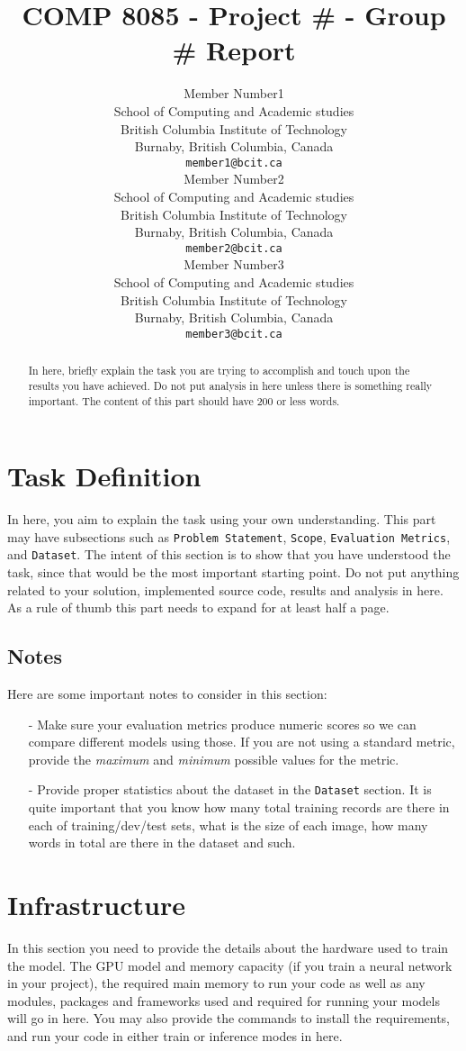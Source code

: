 \documentclass{article}
\title{COMP 8085 - Project \# - Group \# Report}
\author{%
  Member Number1\\
  School of Computing and Academic studies\\
  British Columbia Institute of Technology\\
  Burnaby, British Columbia, Canada\\
  \texttt{member1@bcit.ca} \\
  
  \And
  Member Number2\\
  School of Computing and Academic studies\\
  British Columbia Institute of Technology\\
  Burnaby, British Columbia, Canada\\
  \texttt{member2@bcit.ca} \\

  \And 
  Member Number3\\
  School of Computing and Academic studies\\
  British Columbia Institute of Technology\\
  Burnaby, British Columbia, Canada\\
  \texttt{member3@bcit.ca}
}
\begin{document}
\maketitle


\begin{abstract}
  In here, briefly explain the task you are trying to accomplish and touch upon the results you have achieved. Do not put analysis in here unless there is something really important. The content of this part should have 200 or less words.
\end{abstract}


\section{Task Definition}\label{sec:definition}
In here, you aim to explain the task using your own understanding. This part may have subsections such as \texttt{Problem Statement}, \texttt{Scope}, \texttt{Evaluation Metrics}, and \texttt{Dataset}.
The intent of this section is to show that you have understood the task, since that would be the most important starting point. Do not put anything related to your solution, implemented source code, results and analysis in here. As a rule of thumb this part needs to expand for at least half a page.

\subsection{Notes}
Here are some important notes to consider in this section:
    \begin{itemize}
        \item[-] Make sure your evaluation metrics produce numeric scores so we can compare different models using those. If you are not using a standard metric, provide the \textit{maximum} and \textit{minimum} possible values for the metric.
        
        \item[-] Provide proper statistics about the dataset in the \texttt{Dataset} section. It is quite important that you know how many total training records are there in each of training/dev/test sets, what is the size of each image, how many words in total are there in the dataset and such.
    \end{itemize}


\section{Infrastructure}\label{sec:infrastructure}
In this section you need to provide the details about the hardware used to train the model. The GPU model and memory capacity (if you train a neural network in your project), the required main memory to run your code as well as any modules, packages and frameworks used and required for running your models will go in here. You may also provide the commands to install the requirements, and run your code in either train or inference modes in here.
\end{document}
